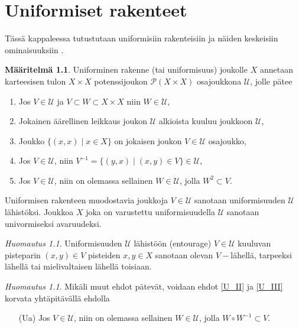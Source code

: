\documentclass[12pt,a4paper,leqno]{report}
\newcommand{\U}{\mathcal{U}}
\newcommand{\Pot}{\mathcal{P}}
\theoremstyle{plain}
\theoremstyle{definition}
\newtheorem{maar}[equation]{Määritelmä}
\theoremstyle{remark}
\newtheorem{huom}[equation]{Huomautus}
\begin{document}
\chapter{Uniformiset rakenteet}
Tässä kappaleessa tutustutaan uniformisiin rakenteisiin ja näiden keskeisiin ominaisuuksiin \cite{Eom1}.
\begin{maar}\label{uniformi_maar}
Uniforminen rakenne (tai uniformisuus) joukolle $X$ annetaan karteesisen tulon $X\times X$ potenssijoukon $\Pot(X\times X)$ osajoukkona $\U$, jolle pätee %
\begin{enumerate} [label=(U\arabic*),ref=(U\arabic*)]
\item\label{F_I} Jos $V\in \U$ ja $V\subset W\subset X\times X$ niin $ W\in\U$,
\item\label{F_II} Jokainen äärellinen leikkaus joukon $\U$ alkioista kuuluu joukkoon $\U$,
\item\label{U_I} Joukko $\{(x,x)\mid x\in X\}$ on jokaisen joukon $V\in\U$ osajoukko,
\item\label{U_II} Jos $V\in\U$, niin $V^{-1}=\{(y,x)\mid (x,y)\in V\}\in\U$,
\item\label{U_III} Jos $V\in \U$, niin on olemassa sellainen $W\in \U$, jolla $ W^2\subset V$.%
\end{enumerate}
Uniformisen rakenteen muodostavia joukkoja $ V\in\U$ sanotaan uniformisuuden $\U$ lähistöksi. Joukkoa $X$ joka on varustettu uniformisuudella $\U$ sanotaan univormiseksi avaruudeksi.
\end{maar}
\begin{huom}
Uniformisuuden $\U$ lähistöön (entourage) $V\in\U $ kuuluvan pisteparin $(x,y)\in V$ pisteiden $x,y\in X$ sanotaan olevan $V-$lähellä, tarpeeksi lähellä tai mielivaltaisen lähellä toisiaan.
\end{huom}
\begin{huom}
Mikäli muut ehdot pätevät, voidaan ehdot \ref{U_II} ja \ref{U_III} korvata yhtäpitävällä ehdolla 
\begin{enumerate}
\item[(Ua)] \label{Uaehto} 
Jos $V\in \U$, niin on olemassa sellainen $W\in \U$, jolla $ W\circ W^{-1}\subset V$.
\end{enumerate}
%
\end{huom}
\end{document}

